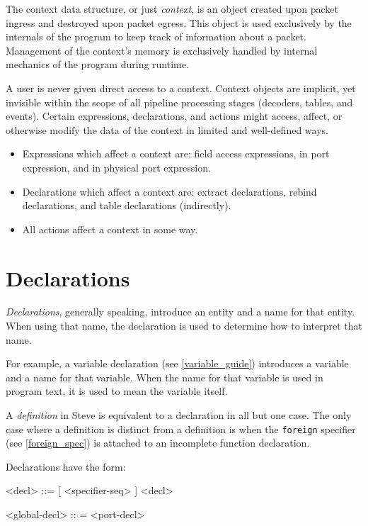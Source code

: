 The context data structure, or just \textit{context}, is an object created upon packet ingress and destroyed upon packet egress. This object is used exclusively by the internals of the program to keep track of information about a packet. Management of the context's memory is exclusively handled by internal mechanics of the program during runtime.

A user is never given direct access to a context. Context objects are implicit, yet invisible within the scope of all pipeline processing stages (decoders, tables, and events). Certain expressions, declarations, and actions might access, affect, or otherwise modify the data of the context in limited and well-defined ways. 
\begin{itemize}
\item Expressions which affect a context are: field access expressions, in port expression, and in physical port expression.

\item Declarations which affect a context are: extract declarations, rebind declarations, and table declarations (indirectly).

\item All actions affect a context in some way.
\end{itemize}

\section{Declarations} \label{declaration_guide}

\textit{Declarations}, generally speaking, introduce an entity and a name for that entity. When using that name, the declaration is used to determine how to interpret that name.

For example, a variable declaration (see \ref{variable_guide}) introduces a variable and a name for that variable. When the name for that variable is used in program text, it is used to mean the variable itself.

A \textit{definition} in Steve is equivalent to a declaration in all but one case. The only case where a definition is distinct from a definition is when the \texttt{foreign} specifier (see \ref{foreign_spec}) is attached to an incomplete function declaration.

Declarations have the form:

\begin{minip}
\begin{grammar}
\singlespace
<decl> ::=
[ <specifier-seq> ] <decl>

<global-decl> :: =
<port-decl>
\end{grammar}
\end{minip}

